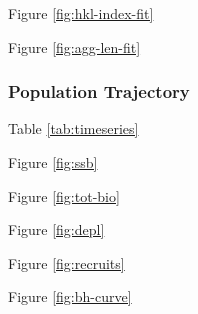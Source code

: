 \documentclass[11pt,
  english,
  a4paper,
]{article}
\begin{document}
Figure \ref{fig:hkl-index-fit}

\leavevmode\tagmcend\tagstructend\par


Figure \ref{fig:agg-len-fit}

\leavevmode\tagmcend\tagstructend\par


\hypertarget{population-trajectory}{%
\subsubsection{Population Trajectory}\label{population-trajectory}}

\leavevmode\tagmcend\tagstructend


Table \ref{tab:timeseries}

\leavevmode\tagmcend\tagstructend\par


Figure \ref{fig:ssb}

\leavevmode\tagmcend\tagstructend\par


Figure \ref{fig:tot-bio}

\leavevmode\tagmcend\tagstructend\par


Figure \ref{fig:depl}

\leavevmode\tagmcend\tagstructend\par


Figure \ref{fig:recruits}

\leavevmode\tagmcend\tagstructend\par


Figure \ref{fig:bh-curve}

\leavevmode\tagmcend\tagstructend\par

\end{document}
